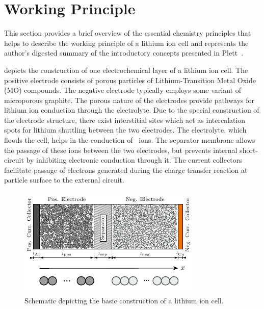 

\section{Working Principle}\label{subsec:liionchemistry}

This section  provides a  brief overview of  the essential  chemistry principles
that  helps  to  describe the  working  principle  of  a  lithium ion  cell  and
represents the author's digested summary  of the introductory concepts presented
in Plett~\cite{Plett2015}.

 depicts the construction of one electrochemical
layer of a lithium ion cell. The positive electrode consists of porous particles
of  Lithium-Transition  Metal  Oxide  (MO)  compounds.  The  negative  electrode
typically employs some variant of microporous graphite. The porous nature of the
electrodes provide pathways for lithium  ion conduction through the electrolyte.
Due  to  the  special  construction  of the  electrode  structure,  there  exist
interstitial  sites  which act  as  intercalation  spots for  lithium  shuttling
between the two electrodes. The electrolyte, which floods the cell, helps in the
conduction of ~ions. The separator membrane allows the passage of these
ions  between  the  two  electrodes,  but  prevents  internal  short-circuit  by
inhibiting electronic  conduction through it. The  current collectors facilitate
passage of electrons  generated during the charge transfer  reaction at particle
surface to the external circuit.

\begin{figure}[!htbp]
    \centering
    \includegraphics[width=\textwidth]{cropped_cell_sandwich_for_thesis}
    \caption[Illustration of a lithium ion cell]{Schematic depicting the basic construction of a lithium ion cell.}
    \label{fig:chargetransferprocess}
\end{figure}

